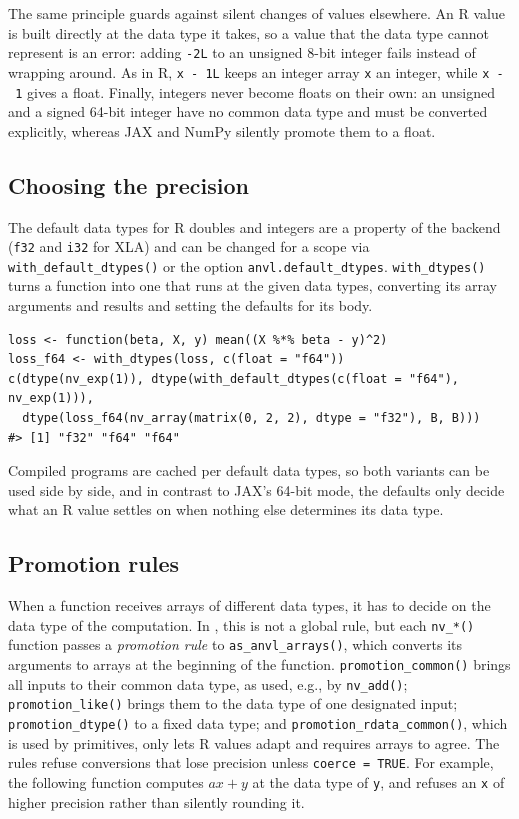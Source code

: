 The same principle guards against silent changes of values elsewhere.
An R value is built directly at the data type it takes, so a value that the data type cannot represent is an error: adding \texttt{-2L} to an unsigned 8-bit integer fails instead of wrapping around.
As in R, \texttt{x\ -\ 1L} keeps an integer array \texttt{x} an integer, while \texttt{x\ -\ 1} gives a float.
Finally, integers never become floats on their own: an unsigned and a signed 64-bit integer have no common data type and must be converted explicitly, whereas JAX and NumPy silently promote them to a float.

\subsection{Choosing the precision}\label{choosing-the-precision}

The default data types for R doubles and integers are a property of the backend (\texttt{f32} and \texttt{i32} for XLA) and can be changed for a scope via \texttt{with\_default\_dtypes()} or the option \texttt{anvl.default\_dtypes}.
\texttt{with\_dtypes()} turns a function into one that runs at the given data types, converting its array arguments and results and setting the defaults for its body.

\begin{verbatim}
loss <- function(beta, X, y) mean((X %*% beta - y)^2)
loss_f64 <- with_dtypes(loss, c(float = "f64"))
c(dtype(nv_exp(1)), dtype(with_default_dtypes(c(float = "f64"), nv_exp(1))),
  dtype(loss_f64(nv_array(matrix(0, 2, 2), dtype = "f32"), B, B)))
#> [1] "f32" "f64" "f64"
\end{verbatim}

Compiled programs are cached per default data types, so both variants can be used side by side, and in contrast to JAX's 64-bit mode, the defaults only decide what an R value settles on when nothing else determines its data type.

\subsection{Promotion rules}\label{promotion-rules}

When a function receives arrays of different data types, it has to decide on the data type of the computation.
In , this is not a global rule, but each \texttt{nv\_*()} function passes a \emph{promotion rule} to \texttt{as\_anvl\_arrays()}, which converts its arguments to arrays at the beginning of the function.
\texttt{promotion\_common()} brings all inputs to their common data type, as used, e.g., by \texttt{nv\_add()}; \texttt{promotion\_like()} brings them to the data type of one designated input; \texttt{promotion\_dtype()} to a fixed data type; and \texttt{promotion\_rdata\_common()}, which is used by primitives, only lets R values adapt and requires arrays to agree.
The rules refuse conversions that lose precision unless \texttt{coerce\ =\ TRUE}.
For example, the following function computes \(a x + y\) at the data type of \texttt{y}, and refuses an \texttt{x} of higher precision rather than silently rounding it.

